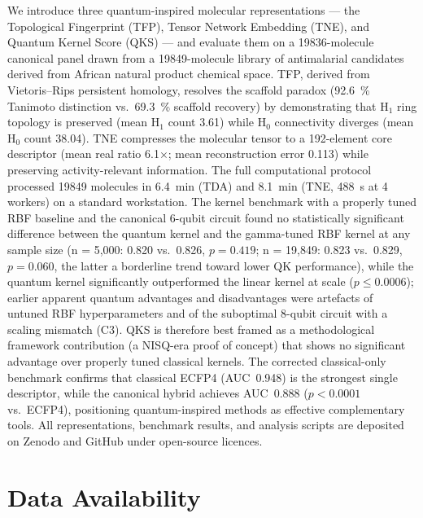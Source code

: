 \documentclass[11pt,a4paper]{article}
\begin{document}
We introduce three quantum-inspired molecular representations --- the Topological Fingerprint (TFP), Tensor Network Embedding (TNE), and Quantum Kernel Score (QKS) --- and evaluate them on a \num{19836}-molecule canonical panel drawn from a \num{19849}-molecule library of antimalarial candidates derived from African natural product chemical space. TFP, derived from Vietoris--Rips persistent homology, resolves the scaffold paradox (\qty{92.6}{\percent} Tanimoto distinction vs.\ \qty{69.3}{\percent} scaffold recovery) by demonstrating that H$_1$ ring topology is preserved (mean H$_1$ count 3.61) while H$_0$ connectivity diverges (mean H$_0$ count 38.04). TNE compresses the molecular tensor to a \num{192}-element core descriptor (mean real ratio \num{6.1}$\times$; mean reconstruction error 0.113) while preserving activity-relevant information. The full computational protocol processed \num{19849} molecules in \SI{6.4}{\minute} (TDA) and \SI{8.1}{\minute} (TNE, \SI{488}{\second} at 4 workers) on a standard workstation. The kernel benchmark with a properly tuned RBF baseline and the canonical 6-qubit circuit found no statistically significant difference between the quantum kernel and the gamma-tuned RBF kernel at any sample size (n = 5,000: 0.820 vs.~0.826, $p = 0.419$; n = 19,849: 0.823 vs.~0.829, $p = 0.060$, the latter a borderline trend toward lower QK performance), while the quantum kernel significantly outperformed the linear kernel at scale ($p \leq 0.0006$); earlier apparent quantum advantages and disadvantages were artefacts of untuned RBF hyperparameters and of the suboptimal 8-qubit circuit with a scaling mismatch (C3). QKS is therefore best framed as a methodological framework contribution (a NISQ-era proof of concept) that shows no significant advantage over properly tuned classical kernels. The corrected classical-only benchmark confirms that classical ECFP4 (AUC~0.948) is the strongest single descriptor, while the canonical hybrid achieves AUC~\num{0.888} ($p < 0.0001$ vs.~ECFP4), positioning quantum-inspired methods as effective complementary tools. All representations, benchmark results, and analysis scripts are deposited on Zenodo and GitHub under open-source licences.


\section*{Data Availability}
\end{document}
